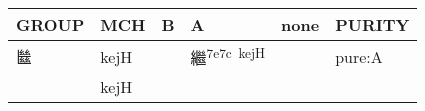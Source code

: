 \documentclass[14pt,a4paper]{scrartcl}
\begin{document}
\begin{longtable}[c]{@{}llllll@{}}
\toprule
\begin{minipage}[b]{0.14\columnwidth}\raggedright\strut
GROUP
\strut\end{minipage} &
\begin{minipage}[b]{0.14\columnwidth}\raggedright\strut
MCH
\strut\end{minipage} &
\begin{minipage}[b]{0.14\columnwidth}\raggedright\strut
B
\strut\end{minipage} &
\begin{minipage}[b]{0.14\columnwidth}\raggedright\strut
A
\strut\end{minipage} &
\begin{minipage}[b]{0.14\columnwidth}\raggedright\strut
none
\strut\end{minipage} &
\begin{minipage}[b]{0.14\columnwidth}\raggedright\strut
PURITY
\strut\end{minipage}\tabularnewline
\midrule
\endhead
\begin{minipage}[t]{0.14\columnwidth}\raggedright\strut
㡭
\strut\end{minipage} &
\begin{minipage}[t]{0.14\columnwidth}\raggedright\strut
kejH
\strut\end{minipage} &
\begin{minipage}[t]{0.14\columnwidth}\raggedright\strut
\strut\end{minipage} &
\begin{minipage}[t]{0.14\columnwidth}\raggedright\strut
繼\textsuperscript{7e7c~kejH}
\strut\end{minipage} &
\begin{minipage}[t]{0.14\columnwidth}\raggedright\strut
\strut\end{minipage} &
\begin{minipage}[t]{0.14\columnwidth}\raggedright\strut
pure:A
\strut\end{minipage}\tabularnewline
\begin{minipage}[t]{0.14\columnwidth}\raggedright\strut
𤾕
\strut\end{minipage} &
\begin{minipage}[t]{0.14\columnwidth}\raggedright\strut
kejH
\strut\end{minipage} &
\begin{minipage}[t]{0.14\columnwidth}\raggedright\strut
\strut\end{minipage} &
\begin{minipage}[t]{0.14\columnwidth}\raggedright\strut

\end{minipage}
\end{longtable}
\end{document}
